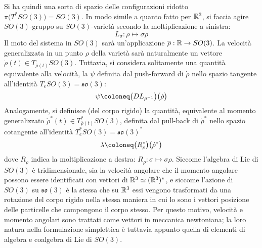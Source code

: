 Si ha quindi una sorta di spazio delle configurazioni ridotto $\pi\big(T^*SO(3)\big) = SO(3)$. In modo simile a quanto fatto per $\mathbb{R}^3$, si faccia agire $SO(3)$-gruppo su $SO(3)$-varietà secondo la moltiplicazione a sinistra:
\begin{equation}
L_{\sigma}: \rho \longmapsto \sigma \rho 
\end{equation} 
Il moto del sistema in $SO(3)$ sarà un'applicazione $\overline{\rho}: \mathbb{R} \to SO(3)$. La velocità generalizzata in un punto $\rho$ della varietà sarà naturalmente un vettore $\dot{\rho}(t) \in T_{\overline{\rho}(t)}SO(3)$. Tuttavia, si considera solitamente una quantità equivalente alla velocità, la  $\psi$ definita dal push-forward di $\dot{\rho}$ nello spazio tangente all'identità $T_e SO(3) = \mathfrak{so(3)}$:
\begin{equation}
\psi \defeq \big(D L_{\rho^{-1}}\big)\big(\dot{\rho}\big)
\end{equation}
Analogamente, si definisce  (del corpo rigido) la quantità, equivalente al momento generalizzato $\dot{\rho}^*(t) \in T^*_{\overline{\rho}(t)}SO(3)$, definita dal pull-back di $\dot{\rho}^*$ nello spazio cotangente all'identità $T^*_e SO(3) = \mathfrak{so(3)}^*$
\begin{equation}
\lambda \defeq \big(R^*_{\rho} \big)\big(\dot{\rho}^*\big)
\end{equation} 
dove $R_\rho$ indica la moltiplicazione a destra: $R_\rho: \sigma \mapsto \sigma \rho$. Siccome l'algebra di Lie di $SO(3)$ è tridimensionale, sia la velocità angolare che il momento angolare possono essere identificati con vettori di $\mathbb{R}^3 \simeq (\mathbb{R}^3)^*$, e siccome l'azione di $SO(3)$ su $\mathfrak{so(3)}$ è la stessa che su $\mathbb{R}^3$ essi vengono trasformati da una rotazione del corpo rigido nella stessa maniera in cui lo sono i vettori posizione delle particelle che compongono il corpo stesso. Per questo motivo, velocità e momento angolari sono trattati come vettori in meccanica newtoniana; la loro natura nella formulazione simplettica è tuttavia appunto quella di elementi di algebra e coalgebra di Lie di $SO(3)$.

